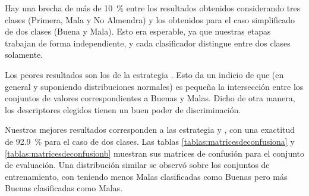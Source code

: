 Hay una brecha de más de \SI{10}{\percent} entre los resultados obtenidos considerando tres clases (Primera, Mala y No Almendra) y los obtenidos para el caso simplificado de dos clases (Buena y Mala). Esto era esperable, ya que nuestras etapas trabajan de forma independiente, y cada clasificador distingue entre dos clases solamente.

Los peores resultados son los de la estrategia \textbf{}. Esto da un indicio de que (en general y suponiendo distribuciones normales) es pequeña la intersección entre los conjuntos de valores correspondientes a Buenas y Malas. Dicho de otra manera, los descriptores elegidos tienen un buen poder de discriminación.

Nuestros mejores resultados corresponden a las estrategia \textbf{} y \textbf{}, con una exactitud de \SI{92,9}{\percent} para el caso de dos clases. Las tablas \ref{tablas:matricesdeconfusiona} y \ref{tablas:matricesdeconfusionb} muestran sus matrices de confusión para el conjunto de evaluación. Una distribución similar se observó sobre los conjuntos de entrenamiento, con \textbf{} teniendo menos Malas clasificadas como Buenas pero más Buenas clasificadas como Malas.

